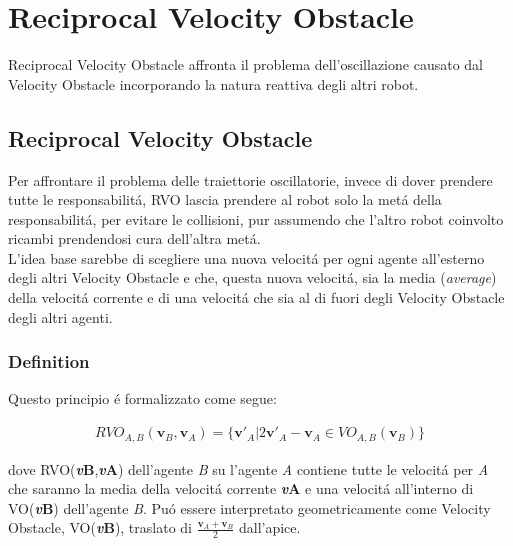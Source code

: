 
\chapter{Reciprocal Velocity Obstacle}
\label{cap:rvo}

Reciprocal Velocity Obstacle affronta il problema dell'oscillazione causato dal Velocity Obstacle incorporando la natura reattiva degli altri robot.

\section{Reciprocal Velocity Obstacle}
Per affrontare il problema delle traiettorie oscillatorie, invece di dover prendere tutte le responsabilit\'a, RVO lascia prendere al robot solo la met\'a della responsabilit\'a, per evitare le collisioni, pur assumendo che l'altro robot coinvolto ricambi prendendosi cura dell'altra met\'a.
\\L'idea base sarebbe di scegliere una nuova velocit\'a per ogni agente all'esterno degli altri Velocity Obstacle e che, questa nuova velocit\'a,  sia la media (\textit{average}) della velocit\'a corrente e di una velocit\'a che sia al di fuori degli Velocity Obstacle degli altri agenti. 

\subsection{Definition}

Questo principio \'e formalizzato come segue:

\begin{gather}
RVO_{A,B}({\boldsymbol{v}_ B}, {\boldsymbol{v}_A} ) =  \{ \boldsymbol{v'}_{A} | 2\boldsymbol{v'}_{A} - \boldsymbol{v}_{A} \in VO_{A,B}(\boldsymbol{v}_{B})  \}
\end{gather}

dove RVO({\bfseries\textit{v}\ped B},{\bfseries\textit{v}\ped A}) dell'agente \textit{B} su l'agente \textit{A} contiene tutte le velocit\'a per \textit{A} che saranno la media della velocit\'a corrente {\bfseries\textit{v}\ped A} e una velocit\'a all'interno di VO({\bfseries\textit{v}\ped B}) dell'agente \textit{B}. Pu\'o essere interpretato geometricamente come Velocity Obstacle, VO({\bfseries\textit{v}\ped B}),  traslato di $\tfrac{\boldsymbol{v}_ A + \boldsymbol{v}_ B}{2}$ dall'apice.


